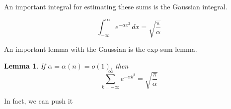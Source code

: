 \documentclass[]{article}
\newtheorem{lemma}[theorem]{Lemma}
\theoremstyle{definition}
\numberwithin{theorem}{section}
\numberwithin{equation}{section}
\begin{document}
An important integral for estimating these sums is the Gaussian integral.

\begin{equation}
	\int_{-\infty}^\infty e^{- \alpha x^2} \, dx = \sqrt{\frac{\pi}{\alpha}}
\end{equation}

An important lemma with the Gaussian is the exp-sum lemma.
\begin{lemma}
	If $\alpha = \alpha(n) = o(1)$, then
\begin{equation}
	\sum_{k = -\infty}^\infty e^{- \alpha k^2} = \sqrt{\frac{\pi}{\alpha}}
\end{equation}
\end{lemma}

In fact, we can push it
\end{document}
